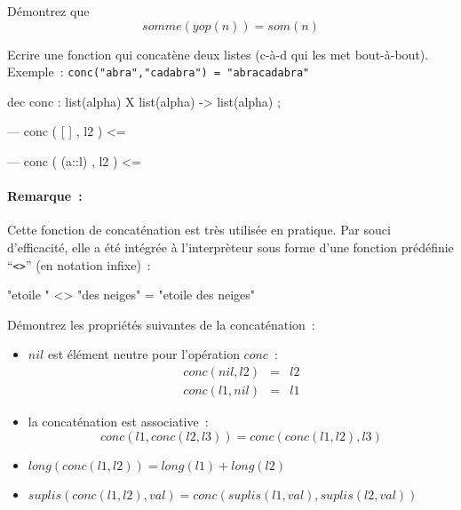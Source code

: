 \begin{exercice}





Démontrez que $$somme(yop(n))=som(n)$$

\end{exercice}








\begin{exercice}

 Ecrire une fonction qui concatène deux listes (c-à-d qui les met bout-à-bout).
Exemple~: \verb+conc("abra","cadabra") = "abracadabra"+

\begin{verbatimtab}
dec conc : list(alpha) X list(alpha) -> list(alpha) ;

--- conc ( [  ]   ,  l2 ) 	<=

--- conc ( (a::l) , l2 )	<= 

\end{verbatimtab}
\end{exercice}

\paragraph*{Remarque~: } Cette fonction de concaténation 
est très utilisée en pratique. Par souci d'efficacité, elle a été
intégrée à l'interprèteur sous forme d'une fonction prédéfinie ``\verb+<>+''
(en notation infixe)~:

\begin{verbatimtab}
"etoile " <> "des neiges" = "etoile des neiges"
\end{verbatimtab}

\begin{exercice}
Démontrez les propriétés suivantes de la concaténation~:
\begin{itemize}
\item $nil$ est élément neutre pour l'opération $conc$~: 
$$\begin{array}{rcl}
conc(nil,l2) &=& l2\\
conc(l1,nil) &=& l1
\end{array}$$
\item la concaténation est associative~: 
$$ conc(l1,conc(l2,l3)) = conc( conc(l1,l2) , l3) $$
\item $long(conc(l1,l2)) = long(l1) + long(l2)$
\item $ suplis(conc(l1,l2),val) = conc( suplis(l1,val) , suplis(l2,val) )$
\end{itemize}
\end{exercice}

